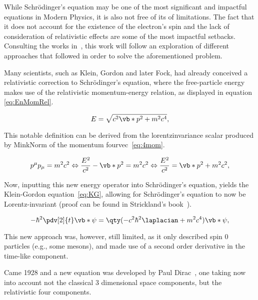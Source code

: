 While Schrödinger's equation may be one of the most significant and impactful equations in Modern Physics, it is also not free of its of limitations. The fact that it does not account for the existence of the electron's spin and the lack of consideration of relativistic effects are some of the most impactful setbacks. Consulting the works in~\cite{Thaller1992,Beyer2016,Sakurai2020,Bethe1977}, this work will follow an exploration of different approaches that followed in order to solve the aforementioned problem.






Many scientists, such as Klein, Gordon and later Fock, had already conceived a relativistic correction to Schrödinger's equation, where the free-particle energy makes use of the relativistic momentum-energy relation,  as displayed in equation \eqref{eq:EnMomRel}.


 \begin{equation}
    E=\sqrt{c^2\vb*{p}^2+m^2c^4},
    \label{eq:EnMomRel}
 \end{equation}


 This notable definition can be derived from the \gls{lorentzinvariance} scalar produced by \gls{MinkNorm} of the momentum \gls{fourvec}~\eqref{eq:4mom}.


 \begin{equation}
    p^\mu p_\mu = m^2c^2\Leftrightarrow\dfrac{E^2}{c^2}-\vb*{p}^2=m^2c^2 \Leftrightarrow  \dfrac{E^2}{c^2}= \vb*{p}^2 +m^2c^2,
    \label{eq:4mom}
\end{equation}

 Now, inputting this new energy operator into Schrödinger's equation, yields the Klein-Gordon equation~\eqref{eq:KG}, allowing for Schrödinger's equation to now be Lorentz-invariant (proof can be found in Strickland's book~\cite{Strickland}).

 \begin{equation}
    -\hbar^2 \pdv[2]{t} \vb*{\psi}=\qty(-c^2\hbar^2\laplacian + m^2c^4)\vb*{\psi},
    \label{eq:KG}
\end{equation}



 This new approach was, however, still limited, as it only described spin 0 particles (e.g., some mesons), and made use of a second order derivative in the time-like component.

Came 1928 and a new equation was developed by Paul Dirac~\cite{Dirac}, one taking now into account not the classical 3 dimensional space components, but the relativistic four components.




